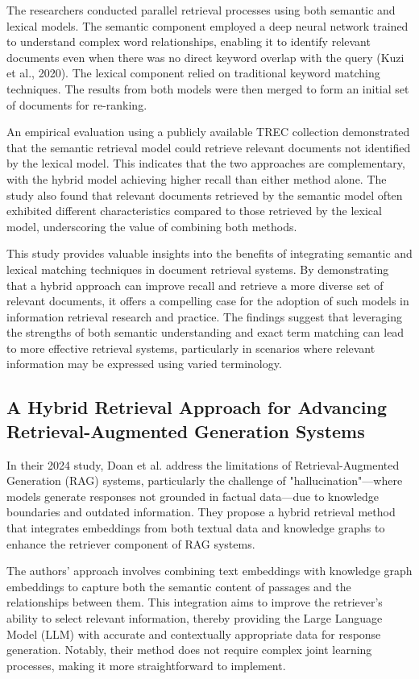 The researchers conducted parallel retrieval processes using both semantic and lexical models. The semantic component employed a deep neural network trained to understand complex word relationships, enabling it to identify relevant documents even when there was no direct keyword overlap with the query (Kuzi et al., 2020). The lexical component relied on traditional keyword matching techniques. The results from both models were then merged to form an initial set of documents for re-ranking.

An empirical evaluation using a publicly available TREC collection demonstrated that the semantic retrieval model could retrieve relevant documents not identified by the lexical model. This indicates that the two approaches are complementary, with the hybrid model achieving higher recall than either method alone. The study also found that relevant documents retrieved by the semantic model often exhibited different characteristics compared to those retrieved by the lexical model, underscoring the value of combining both methods.

This study provides valuable insights into the benefits of integrating semantic and lexical matching techniques in document retrieval systems. By demonstrating that a hybrid approach can improve recall and retrieve a more diverse set of relevant documents, it offers a compelling case for the adoption of such models in information retrieval research and practice. The findings suggest that leveraging the strengths of both semantic understanding and exact term matching can lead to more effective retrieval systems, particularly in scenarios where relevant information may be expressed using varied terminology.

\subsection{A Hybrid Retrieval Approach for Advancing Retrieval-Augmented Generation Systems}

In their 2024 study, Doan et al. address the limitations of Retrieval-Augmented Generation (RAG) systems, particularly the challenge of "hallucination"—where models generate responses not grounded in factual data—due to knowledge boundaries and outdated information. They propose a hybrid retrieval method that integrates embeddings from both textual data and knowledge graphs to enhance the retriever component of RAG systems.

The authors' approach involves combining text embeddings with knowledge graph embeddings to capture both the semantic content of passages and the relationships between them. This integration aims to improve the retriever's ability to select relevant information, thereby providing the Large Language Model (LLM) with accurate and contextually appropriate data for response generation. Notably, their method does not require complex joint learning processes, making it more straightforward to implement.

